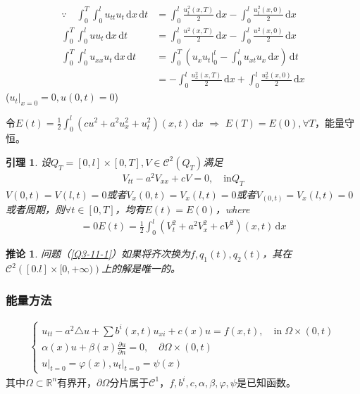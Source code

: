 \documentclass[11pt, a4paper]{article}
\theoremstyle{theorem}
\newtheorem{lemma}[thm]{引理}
\newtheorem{cor}[thm]{推论}
\newcommand{\intd}[1]{\,\mathrm{d}{#1}}
\begin{document}
\begin{align*}
\because \quad \int_0^T \int_0^l u_{tt}u_t \intd x \intd t &=\int_0^l \frac{u_t^2(x,T)}{2} \intd x - \int_0^l \frac{u_t^2(x,0)}{2} \intd x \\
\int_0^T \int_0^l u u_t \intd x \intd t &=\int_0^l \frac{u^2(x,T)}{2} \intd x - \int_0^l \frac{u^2(x,0)}{2} \intd x \\
\int_0^T \int_0^l u_{xx}u_t \intd x \intd t &= \int_0^T \left(u_x u_t \bigg|_0^l - \int_0^l u_{xt}u_x \intd x \right) \intd t \\
&= - \int_0^l \frac{u_x^2(x,T)}{2} \intd x + \int_0^l \frac{u_x^2(x,0)}{2} \intd x
\end{align*}
($u_t \bigg|_{x = 0} = 0, u(0,t) = 0$)

令$E(t) = \frac{1}{2} \int_0^l \left(cu^2 + a^2 u_x^2 + u_t^2\right)(x,t) \intd x$ $\Rightarrow$ $E(T) = E(0), \forall T$，能量守恒。

\begin{lemma}
设$Q_T = [0,l] \times [0,T], V \in \mathcal{C}^2(Q_T)$满足
\begin{align}
    V_{tt}  - a^2 V_{xx} + cV = 0, \quad \text{in} Q_T
\end{align}
$V(0,t) = V(l,t) = 0$或者$V_x(0,t) = V_x(l,t) = 0$或者$V_(0,t) = V_x(l,t) = 0$或者周期，则$\forall t \in [0,T]$，均有$E(t) = E(0)$，where
\begin{align} = 0
    E(t) = \frac{1}{2} \int_0^l \left(V_t^2 + a^2 V_x^2 + cV^2\right)(x,t) \intd x
\end{align}
\end{lemma}

\begin{cor}
问题（\ref{Q3-11-1}）如果将齐次换为$f, q_1(t), q_2(t)$，其在$\mathcal{C}^2\left([0.l] \times [0,+\infty) \right)$上的解是唯一的。
\end{cor}

\subsubsection{能量方法}

\begin{align}
    \label{Q3-11-2}
    \begin{cases}
    u_{tt} - a^2 \triangle u + \sum b^i(x,t) u_{xi} + c(x) u = f(x,t), \quad \text{in}\; \Omega \times (0,t) \\
    \alpha(x) u + \beta(x) \frac{\partial u}{\partial n} = 0, \quad \partial \Omega \times (0,t) \\
    u \bigg|_{t = 0} = \varphi(x), u_t \bigg|_{t = 0} = \psi(x)
    \end{cases}
\end{align}
其中$\Omega \subset \mathbb{R}^n$有界开，$\partial \Omega$分片属于$\mathcal{C}^1$，$f, b^i, c, \alpha, \beta, \varphi, \psi$是已知函数。
\end{document}
